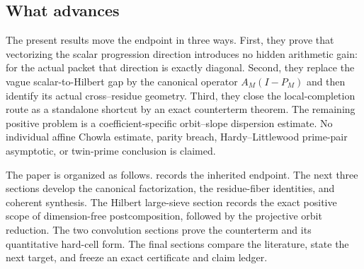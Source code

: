 \subsection{What advances}

The present results move the endpoint in three ways.  First, they prove
that vectorizing the scalar progression direction introduces no hidden
arithmetic gain: for the actual packet that direction is exactly
diagonal.  Second, they replace the vague scalar-to-Hilbert gap by the
canonical operator \(A_M(I-P_M)\) and then identify its actual
cross--residue geometry.  Third, they close the local-completion route as
a standalone shortcut by an exact counterterm theorem.  The remaining
positive problem is a coefficient-specific orbit--slope dispersion
estimate.  No individual affine Chowla estimate, parity breach,
Hardy--Littlewood prime-pair asymptotic, or twin-prime conclusion is
claimed.

The paper is organized as follows.   records
the inherited endpoint.  The next three sections develop the canonical
factorization, the residue-fiber identities, and coherent synthesis.  The
Hilbert large-sieve section records the exact positive scope of
dimension-free postcomposition, followed by the projective orbit
reduction.  The two
convolution sections prove the counterterm and its quantitative hard-cell
form.  The final sections compare the literature, state the next target,
and freeze an exact certificate and claim ledger.

